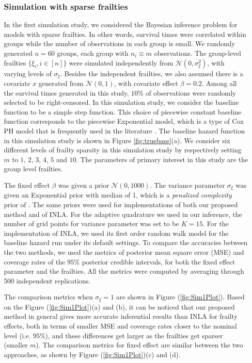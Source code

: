 \documentclass[ba]{imsart}
\begin{document}
\subsubsection{Simulation with sparse frailties}\label{subsubsec:sim1}

In the first simulation study, we considered the Bayesian inference problem for models with sparse frailties. In other words, survival times were correlated within groups while the number of observations in each group is small. We randomly generated $n = 60$ groups, each group with $n_i \equiv m$ observations. The group-level frailties $\{\xi_i, i\in [n] \}$ were simulated independently from $\mathcal{N}(0,\sigma_\xi^{2})$, with varying levels of $\sigma_{\xi}$. Besides the independent frailties, we also assumed there is a covariate $x$ generated from $\mathcal{N}(0,1)$, with covariate effect $\beta = 0.2$. Among all the survival times generated in this study, $10\%$ of observations were randomly selected to be right-censored. In this simulation study, we consider the baseline function to be a simple step function. This choice of piecewise constant baseline function corresponds to the piecewise Exponential model, which is a type of Cox PH model that is frequently used in the literature \citep{piecewiseExp}.
The baseline hazard function in this simulation study is shown in Figure \ref{fig:truebase}(a). We consider six different levels of frailty sparsity in this simulation study by respectively setting $m$ to $1$, $2$, $3$, $4$, $5$ and $10$. The parameters of primary interest in this study are the group level frailties.

The fixed effect $\beta$ was given a prior $\mathcal{N}(0,1000)$. The variance parameter $\sigma_\xi$ was given an Exponential prior with median of 1, which is a \emph{penalized complexity} prior of \cite{pcprior}. The same priors were used for implementations of both our proposed method and of INLA. For the adaptive quadrature we used in our inference, the number of grid points for variance parameter was set to be $K = 15$. For the implementation of INLA, we used its first order random walk model for the baseline hazard run under its default settings. To compare the accuracies between the two methods, we used the metrics of posterior mean square error (MSE) and coverage rates of the $95\%$ posterior credible intervals, for both the fixed effect parameter and the frailties. All the metrics were computed by averaging through 500 independent replications. 

The comparison metrics when $\sigma_\xi = 1$ are shown in Figure (\ref{fig:Sim1Plot}). Based on the Figure (\ref{fig:Sim1Plot})(a) and (b), it can be noticed that our proposed method in general gives more accurate inferential results than INLA for frailty effects, both in terms of smaller MSE and coverage rates closer to the nominal level (i.e. $95\%$), and these differences get larger as the frailties get sparser (smaller $m$). 
The comparison metrics for fixed effect are similar between the two approaches, as shown by Figure (\ref{fig:Sim1Plot})(c) and (d).
\end{document}
